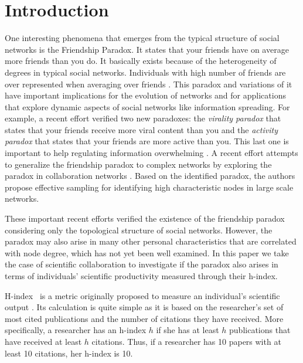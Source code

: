 \documentclass[letterpaper]{article}
\begin{document}
\section{Introduction}

One interesting phenomena that emerges from the typical structure of social networks is the Friendship Paradox. It states that your friends have on average more friends than you do. It basically exists because of the heterogeneity of degrees in typical social networks. Individuals with high number of friends are over represented when averaging over friends \cite{quatro}. This paradox and variations of it have important implications for the evolution of networks and for applications that explore dynamic aspects of social networks like information spreading. For example,
a recent effort verified two new paradoxes: the \textit{virality paradox} that states that your friends receive more viral content than you and the \textit{activity paradox} that states that your friends are more active than you. This last one is important to help regulating information overwhelming \cite{tres}. A recent effort attempts to generalize the friendship paradox to complex networks by exploring the paradox in collaboration networks \cite{eom2014generalized}. Based on the identified paradox, the authors propose effective sampling for identifying high characteristic nodes in large scale networks.

These important recent efforts verified the existence of the friendship paradox considering only the topological structure of social networks. However, the paradox may also arise in many other personal characteristics that are correlated with node degree, which has not yet been well examined. In this paper we take the case of scientific collaboration to investigate if the paradox also arises in terms of individuals' scientific productivity measured through their h-index.

H-index~\cite{Hirsch:2005} is a metric originally proposed to measure an individual's scientific output \cite{dois}. Its calculation is quite simple as it is based on the researcher's set of most cited publications and the number of citations they have received.  More specifically, a researcher has an h-index $h$ if she has at least $h$ publications that have received at least $h$ citations. Thus, if a researcher has 10 papers with at least 10 citations, her h-index is 10.
\end{document}
